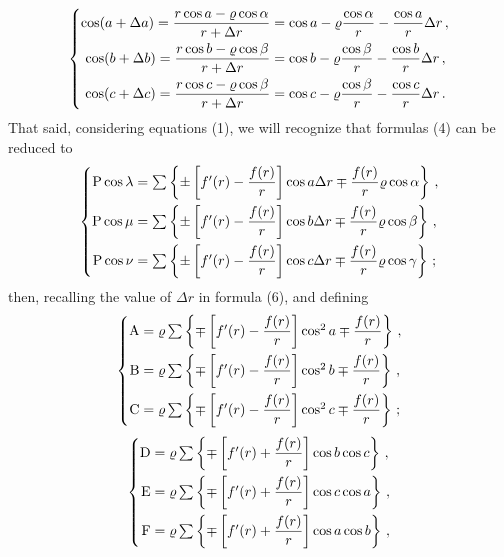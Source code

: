 \documentclass[leqno,openright,smallroyalvopaper,8pt,twoside,showtrims]{memoir}
\begin{document}
\begin{equation}
\begin{dcases}
\begin{aligned}
\cos(a+\Delta a)=\dfrac{r\cos a-\varrho\cos\alpha}{r+\Delta r}&=\cos a - \varrho\dfrac{\cos \alpha}{r}-\dfrac{\cos a}{r}\Delta r\,,\\
\cos(b+\Delta b)=\dfrac{r\cos b-\varrho\cos\beta}{r+\Delta r}&=\cos b - \varrho\dfrac{\cos \beta}{r}-\dfrac{\cos b}{r}\Delta r\,,\\
\cos(c+\Delta c)=\dfrac{r\cos c-\varrho\cos\beta}{r+\Delta r}&=\cos c - \varrho\dfrac{\cos \beta}{r}-\dfrac{\cos c}{r}\Delta r\,.
\end{aligned}
\end{dcases}
\end{equation}
That said, considering equations (1), we will recognize that formulas (4) can be reduced to
\begin{equation}
\begin{dcases}
\begin{aligned}
\text{P}\cos\lambda&=\textstyle\sum\left \{\pm \left[f'(r)-\dfrac{f(r)}{r}\right ]\cos a \Delta r\mp\dfrac{f(r)}{r}\varrho\cos\alpha\right \}\,,\\
\text{P}\cos\mu&=\textstyle\sum\left \{\pm \left[f'(r)-\dfrac{f(r)}{r}\right ]\cos b \Delta r\mp\dfrac{f(r)}{r}\varrho\cos\beta\right \}\,,\\
\text{P}\cos\nu&=\textstyle\sum\left \{\pm \left[f'(r)-\dfrac{f(r)}{r}\right ]\cos c \Delta r\mp\dfrac{f(r)}{r}\varrho\cos\gamma\right \}\,;
\end{aligned}
\end{dcases}
\end{equation}
then, recalling the value of $\Delta r$ in formula (6), and defining
\begin{equation}
\begin{dcases}
\begin{aligned}
\text{A}&=\varrho\textstyle\sum\left \{\mp \left[f'(r)-\dfrac{f(r)}{r}\right ]\cos^2 a \mp\dfrac{f(r)}{r}\right \}\,,\\
\text{B}&=\varrho\textstyle\sum\left \{\mp \left[f'(r)-\dfrac{f(r)}{r}\right ]\cos^2 b \mp\dfrac{f(r)}{r}\right \}\,,\\
\text{C}&=\varrho\textstyle\sum\left \{\mp \left[f'(r)-\dfrac{f(r)}{r}\right ]\cos^2 c \mp\dfrac{f(r)}{r}\right \}\,;
\end{aligned}
\end{dcases}
\end{equation}
\begin{equation}
\begin{dcases}
\begin{aligned}
\text{D}&=\varrho\textstyle\sum\left \{\mp \left[f'(r)+\dfrac{f(r)}{r}\right ]\cos b \cos c\right \}\,,\\
\text{E}&=\varrho\textstyle\sum\left \{\mp \left[f'(r)+\dfrac{f(r)}{r}\right ]\cos c \cos a\right \}\,,\\
\text{F}&=\varrho\textstyle\sum\left \{\mp \left[f'(r)+\dfrac{f(r)}{r}\right ]\cos a \cos b\right \}\,,
\end{aligned}
\end{dcases}
\end{equation}
\end{document}
